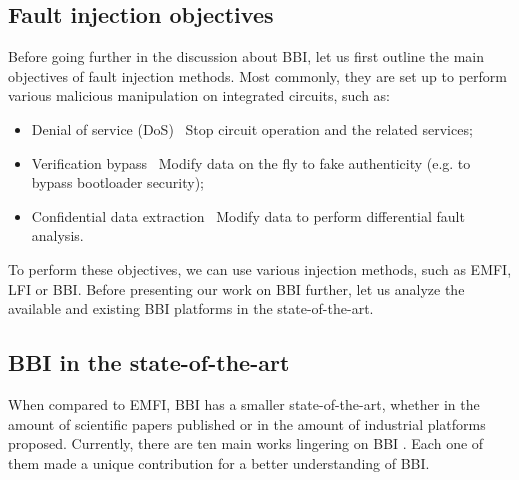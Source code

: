 


	\subsection{Fault injection objectives}
		Before going further in the discussion about BBI, let us first outline the main objectives of fault injection methods.
		Most commonly, they are set up to perform various malicious manipulation on integrated circuits, such as:
		\begin{itemize}
			\item Denial of service (DoS) \textrightarrow\ Stop circuit operation and the related services;
			\item Verification bypass \textrightarrow\ Modify data on the fly to fake authenticity (e.g. to bypass bootloader security);
			\item Confidential data extraction \textrightarrow\ Modify data to perform differential fault analysis.
		\end{itemize}
		To perform these objectives, we can use various injection methods, such as EMFI, LFI or BBI.
		Before presenting our work on BBI further, let us analyze the available and existing BBI platforms in the state-of-the-art.

	\subsection{BBI in the state-of-the-art}
%
		When compared to EMFI, BBI has a smaller state-of-the-art, whether in the amount of scientific papers published or in the amount of industrial platforms proposed.
		Currently, there are ten main works lingering on BBI \cite{bbiOrigin, bbiSecond, bbiThird, bbiColin,japbbi, japbbi2, mybbiCosade, mybbiFdtc2022, mybbifdtc2023, colinFdtc2023}.
		Each one of them made a unique contribution for a better understanding of BBI.

